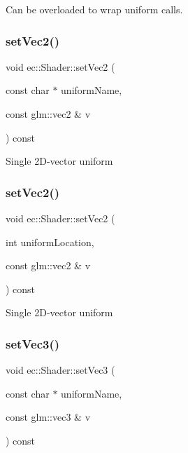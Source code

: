 Can be overloaded to wrap uniform calls. \mbox{\label{classec_1_1_shader_abf4ccc409632dc1fd74d8334b835d8c5}} 
\subsubsection{\texorpdfstring{set\+Vec2()}{setVec2()}\hspace{0.1cm}{\footnotesize\ttfamily [1/2]}}
{\footnotesize\ttfamily void ec\+::\+Shader\+::set\+Vec2 (\begin{DoxyParamCaption}\item[{const char $\ast$}]{uniform\+Name,  }\item[{const glm\+::vec2 \&}]{v }\end{DoxyParamCaption}) const}

Single 2\+D-\/vector uniform \mbox{\label{classec_1_1_shader_ae369480a833c4bdb910edf5beb8e4273}} 
\subsubsection{\texorpdfstring{set\+Vec2()}{setVec2()}\hspace{0.1cm}{\footnotesize\ttfamily [2/2]}}
{\footnotesize\ttfamily void ec\+::\+Shader\+::set\+Vec2 (\begin{DoxyParamCaption}\item[{int}]{uniform\+Location,  }\item[{const glm\+::vec2 \&}]{v }\end{DoxyParamCaption}) const}

Single 2\+D-\/vector uniform \mbox{\label{classec_1_1_shader_acf40e2badbdb021a269c4fec9b4bfb20}} 
\subsubsection{\texorpdfstring{set\+Vec3()}{setVec3()}\hspace{0.1cm}{\footnotesize\ttfamily [1/2]}}
{\footnotesize\ttfamily void ec\+::\+Shader\+::set\+Vec3 (\begin{DoxyParamCaption}\item[{const char $\ast$}]{uniform\+Name,  }\item[{const glm\+::vec3 \&}]{v }\end{DoxyParamCaption}) const}

